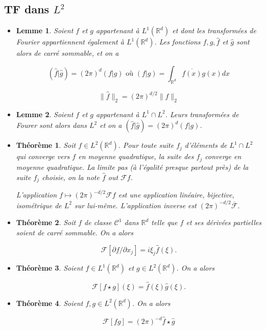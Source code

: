 \documentclass[10pt,a4paper,oneside]{article}
\newtheorem{theoreme}{Théorème}
\newtheorem{lemme}{Lemme}
\begin{document}
\subsection{TF dans $L^2$}

\begin{itemize}
\item
\begin{lemme}
Soient $f$ et $g$ appartenant à $L^1(\mathbb{R}^d)$ et dont les transformées de Fourier appartiennent également à $L^1(\mathbb{R}^d)$. Les fonctions $f, g, \hat{f}$ et $\hat{g}$ sont alors de carré sommable, et on a

\[ (\hat{f} | \hat{g}) = (2\pi)^d (f | g) \text{ où } (f | g) = \int_{\mathbb{R}^d} \overline{f(x)} g(x) dx \]

\[ \| \hat{f} \|_2 = (2\pi)^{d / 2} \| f \|_2 \]
\end{lemme}

\item
\begin{lemme}
Soient $f$ et $g$ appartenant à $L^1 \cap L^2$. Leurs transformées de Fourer sont alors dans $L^2$ et on a $(\hat{f} | \hat{g}) = (2\pi)^d (f | g)$.
\end{lemme}

\item
\begin{theoreme}
Soit $f \in L^2(\mathbb{R}^d)$. Pour toute suite $f_j$ d'éléments de $L^1 \cap L^2$ qui converge vers $f$ en moyenne quadratique, la suite des $\hat{f}_j$ converge en moyenne quadratique. La limite pas (à l'égalité presque partout près) de la suite $f_j$ choisie, on la note $\hat{f}$ out $\mathcal{F} f$.

L'application $f \mapsto (2\pi)^{-d/2} \mathcal{F}f$ est une application linéaire, bijective, isométrique de $L^2$ sur lui-même. L'application inverse est $(2\pi)^{-d/2} \overline{\mathcal{F}}$.
\end{theoreme}

\item
\begin{theoreme}
Soit $f$ de classe $\mathcal{C}^1$ dans $\mathbb{R}^d$ telle que $f$ et ses dérivées partielles soient de carré sommable. On a alors

\[ \mathcal{F}[\partial f / \partial x_j] = i \xi_j \hat{f}(\xi). \]
\end{theoreme}

\item
\begin{theoreme}
Soient $f \in L^1(\mathbb{R}^d)$ et $g \in L^2(\mathbb{R}^d)$. On a alors

\[ \mathcal{F}[f \star g](\xi) = \hat{f}(\xi) \hat{g}(\xi). \]
\end{theoreme}

\item
\begin{theoreme}
Soient $f, g \in L^2(\mathbb{R}^d)$. On a alors

\[ \mathcal{F}[fg] = (2\pi)^{-d} \hat{f} \star \hat{g} \]
\end{theoreme}
\end{itemize}
\end{document}
